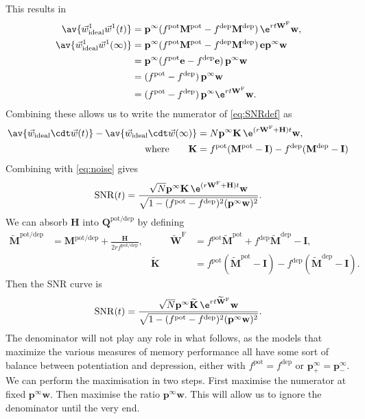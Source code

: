 \documentclass[12pt]{article}
\newcommand{\I}{\mathbf{I}}
\newcommand{\onev}{\mathbf{e}}
\newcommand{\MM}{\mathbf{Q}}
\newcommand{\pr}{\mathbf{p}}
\newcommand{\eq}{\pr^\infty}
\newcommand{\w}{\mathbf{w}}
\newcommand{\W}{\mathbf{W}}
\newcommand{\M}{\mathbf{M}}
\newcommand{\enc}{\mathbf{K}}
\newcommand{\frg}{\W^{\mathrm{F}}}
\newcommand{\pot}{^{\text{pot}}}
\newcommand{\dep}{^{\text{dep}}}
\newcommand{\potdep}{^{\text{pot/dep}}}
\renewcommand{\hom}{\mathbf{H}}
\newcommand{\Mh}{\widetilde{\M}}
\newcommand{\frgh}{\widetilde{\W}^{\mathrm{F}}}
\newcommand{\ench}{\widetilde{\enc}}
\newcommand{\syn}{\vec{w}}
\DeclareMathOperator{\SNR}{SNR}
\begin{document}
This results in
%
\begin{equation}\label{eq:overlapwt}
\begin{aligned}
  \av{\syn^1_\text{ideal}\syn^1(t)} &= \eq (f\pot\M\pot-f\dep\M\dep)\, \e^{rt\frg} \w, \\
  \av{\syn^1_\text{ideal}\syn^1(\infty)} &= \eq (f\pot\M\pot-f\dep\M\dep)\, \onev\eq \w \\
         &= \eq (f\pot\onev-f\dep\onev)\, \eq \w \\
         &=  (f\pot-f\dep)\, \eq \w \\
         &=  (f\pot-f\dep)\, \eq \e^{rt\frg} \w .
\end{aligned}
\end{equation}
%
Combining these allows us to write the numerator of \eqref{eq:SNRdef} as
%
\begin{equation}\label{eq:signal}
\begin{aligned}
  \av{\syn_\text{ideal}\cdt\syn(t)} - \av{\syn_\text{ideal}\cdt\syn(\infty)}
    &= N \eq \enc \, \e^{(r\frg+\hom)t} \w , \\
    \text{where} \qquad
  \enc &= f\pot(\M\pot-\I)-f\dep(\M\dep-\I)
\end{aligned}
\end{equation}
%
Combining with \eqref{eq:noise} gives
%
\begin{equation}\label{eq:SNRcurveExact}
  \SNR(t) = \frac{\sqrt{N} \eq \enc\,\e^{(r\frg+\hom)t}\w}
                 {\sqrt{1-(f\pot-f\dep)^2(\eq\w)^2}}.
\end{equation}
%
We can absorb $\hom$ into $\MM\potdep$ by defining
%
\begin{equation}\label{eq:absorbhom}
\begin{aligned}
  \Mh\potdep &= \M\potdep + \frac{\hom}{2rf\potdep},
  &\qquad
  \frgh &= f\pot\Mh\pot + f\dep\Mh\dep - \I,
  \\&&
  \ench &= f\pot(\Mh\pot-\I)-f\dep(\Mh\dep-\I).
\end{aligned}
\end{equation}
%
Then the SNR curve is
%
\begin{equation}\label{eq:SNRcurvehom}
  \SNR(t) = \frac{\sqrt{N}  \eq \ench \,\e^{rt\frgh}\w}
                 {\sqrt{1-(f\pot-f\dep)^2(\eq\w)^2}}.
\end{equation}
%
The denominator will not play any role in what follows, as the models that maximize the various measures of memory performance all have some sort of balance between potentiation and depression, either with $f\pot=f\dep$ or $\eq_+=\eq_-$.
We can perform the maximisation in two steps.
First maximise the numerator at fixed $\eq\w$.
Then maximise the ratio \wrt $\eq\w$.
This will allow us to ignore the denominator until the very end.
\end{document}
